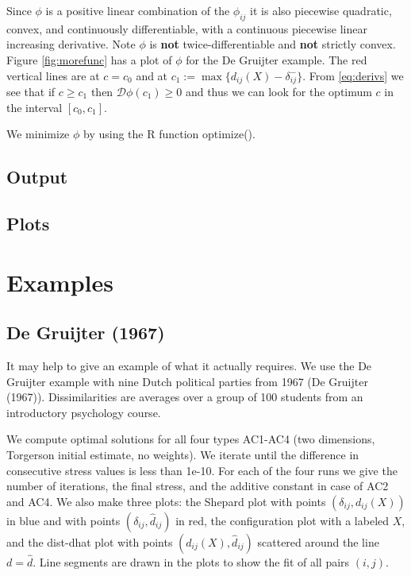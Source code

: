 \documentclass[
  12pt,
]{article}
\begin{document}
Since \(\phi\) is a positive linear combination of the \(\phi_{ij}\) it is also piecewise quadratic, convex, and continuously differentiable,
with a continuous piecewise linear increasing derivative. Note \(\phi\) is \textbf{not} twice-differentiable
and \textbf{not} strictly convex. Figure \ref{fig:morefunc} has a plot of \(\phi\) for the De Gruijter
example. The red vertical lines are at \(c=c_0\) and at \(c_1:=\max\{d_{ij}(X)-\delta_{ij}^-\}\). From \eqref{eq:derivs} we see that if \(c\geq c_1\)
then \(\mathcal{D}\phi(c_1)\geq 0\) and thus we can look for the optimum \(c\) in the interval
\([c_0,c_1]\).

We minimize \(\phi\) by using the R function optimize().

\subsection{Output}\label{output}

\subsection{Plots}\label{plots}

\section{Examples}\label{examples}

\subsection{De Gruijter (1967)}\label{degruijter_67}

It may help to give an example of what it actually requires. We use the De Gruijter example
with nine Dutch political parties from 1967 (De Gruijter (1967)). Dissimilarities are averages over a group of 100 students from an introductory psychology course.

We compute optimal
solutions for all four types AC1-AC4 (two dimensions, Torgerson initial estimate,
no weights). We iterate until the difference in consecutive stress values is
less than 1e-10. For each of the four runs we give the number of iterations,
the final stress, and the additive constant in case of AC2 and AC4. We also
make three plots: the Shepard plot with points \((\delta_{ij},d_{ij}(X))\)
in blue and with points \((\delta_{ij},\hat d_{ij})\) in red, the configuration
plot with a labeled \(X\), and the dist-dhat plot with points \((d_{ij}(X),\hat d_{ij})\)
scattered around the line \(d=\hat d\). Line segments are drawn in the plots to
show the fit of all pairs \((i,j)\).
\end{document}
